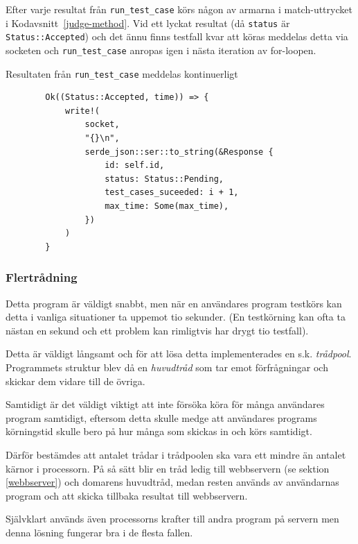 \documentclass{article}
\renewcommand\listingscaption{Kodavsnitt}
\newcommand{\coderef}[1]{\listingscaption~\ref{#1}}
\begin{document}
Efter varje resultat från \texttt{run\_test\_case} körs någon av armarna i
match-uttrycket i \coderef{judge-method}. Vid ett lyckat resultat (då
\texttt{status} är \texttt{Status::Accepted}) och det ännu finns testfall kvar
att köras meddelas detta via socketen och \texttt{run\_test\_case} anropas igen
i nästa iteration av for-loopen.

\begin{listing}[H]
	\caption{Resultaten från \texttt{run\_test\_case} meddelas kontinuerligt}
	\begin{verbatim}
		Ok((Status::Accepted, time)) => {
			write!(
				socket,
				"{}\n",
				serde_json::ser::to_string(&Response {
					id: self.id,
					status: Status::Pending,
					test_cases_suceeded: i + 1,
					max_time: Some(max_time),
				})
			)
		}
	\end{verbatim}
\end{listing}

\subsubsection{Flertrådning}

Detta program är väldigt snabbt, men när en användares program testkörs kan
detta i vanliga situationer ta uppemot tio sekunder. (En testkörning kan ofta ta
nästan en sekund och ett problem kan rimligtvis har drygt tio testfall).

Detta är väldigt långsamt och för att lösa detta implementerades en s.k.
\textit{trådpool}. Programmets struktur blev då en \textit{huvudtråd} som tar
emot förfrågningar och skickar dem vidare till de övriga.


Samtidigt är det väldigt viktigt att inte försöka köra för många användares
program samtidigt, eftersom detta skulle medge att användares programs
körningstid skulle bero på hur många som skickas in och körs samtidigt.

Därför bestämdes att antalet trådar i trådpoolen ska vara ett mindre än antalet
kärnor i processorn. På så sätt blir en tråd ledig till webbservern (se
sektion \ref{webbserver}) och domarens huvudtråd, medan resten används av
användarnas program och att skicka tillbaka resultat till webbservern.

Självklart används även processorns krafter till andra program på servern men
denna lösning fungerar bra i de flesta fallen.
\end{document}
